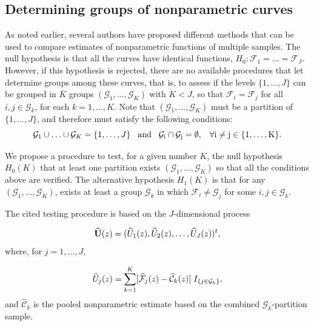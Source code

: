 \subsection{Determining groups of nonparametric curves}
\label{nmvillanueva:survalgorithm}



As noted earlier, several  authors have  proposed different  methods  that can be used to compare estimates of nonparametric functions of multiple samples. 
The null hypothesis is that all the curves have identical  functions, $H_0: \mathcal{F} _1 =  \ldots = \mathcal{F}_J$. However, if this hypothesis is rejected, there are no available procedures that let determine groups among these  curves, that is, to assess if the levels $\{1,\ldots,J\}$ can be grouped in  $K $ groups $(\mathcal{G}_1,\ldots,\mathcal{G}_K)$ with $K< J$, so that $\mathcal{F}_i=\mathcal{F}_j$ for all  $i,j \in \mathcal{G}_k$, for each $k=1,\ldots,K$.  Note that $(\mathcal{G}_1, \ldots, \mathcal{G}_K)$ must be a partition of $\{1, \ldots, J\}$, and therefore must satisfy the following conditions:
\begin{equation}
\mathcal{G}_1 \cup \ldots \cup \mathcal{G}_K= \{1,\ldots,J\} \hspace{0.3cm} \rm{and} \hspace{0.3cm}\mathcal{G}_i \cap \mathcal{G}_j= \emptyset, \hspace{0.3cm} \forall i \neq j \in \{1,\ldots,K\}.
\label{noramv:conditions}
\end{equation} 



We propose a procedure to test, for a given number $K$, the null hypothesis $H_0(K)$ that at least one partition exists $(\mathcal{G}_1,\ldots,\mathcal{G}_K)$ so that  all the conditions above are verified. The alternative hypothesis $H_1(K)$ is that for any $(\mathcal{G}_1,\ldots,\mathcal{G}_K)$, exists at least a group $\mathcal{G}_k$  in which  $\mathcal{F}_i\neq \mathcal{G}_j $ for some $i,j \in \mathcal{G}_k$. 


The cited testing procedure is based on the $J$-dimensional  process 

\[ 
{\bf{\widehat{U}}}(z) = ( \widehat U_1(z), \widehat U_2(z), \ldots, \widehat U_J(z) )^t,
\]
where, for $j = 1, \ldots, J$,

\[ 
\widehat U_j(z) = \sum_{k = 1}^{K}[\widehat{\mathcal{F}}_j(z) - \widehat{\mathcal{C}}_k(z)] \hspace{0.1cm} I_{\{j \in \mathcal{G}_k\}},
\]
and $\widehat{\mathcal{C}}_k$  is the pooled nonparametric estimate based on the combined $\mathcal{G}_k$-partition sample.





